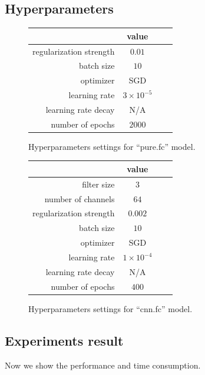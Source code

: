 \documentclass[a4paper]{article}
\begin{document}
\subsection{Hyperparameters}

\begin{figure}[H]
\centering
\begin{tabular}{|r|c|c|c|}
\hline
 & value \\
\hline
regularization strength & $0.01$ \\
\hline
batch size & $10$ \\
\hline
optimizer & SGD \\
\hline
learning rate & $3\times10^{-5}$\\
\hline
learning rate decay & N/A \\
\hline
number of epochs & $2000$ \\
\hline
\end{tabular}
\caption{Hyperparameters settings for ``pure.fc'' model.}
\end{figure}

\begin{figure}[H]
\centering
\begin{tabular}{|r|c|c|c|}
\hline
 & value \\
\hline
filter size & $3$ \\
\hline
number of channels & $64$ \\
\hline
regularization strength & $0.002$ \\
\hline
batch size & $10$ \\
\hline
optimizer & SGD \\
\hline
learning rate & $1\times10^{-4}$\\
\hline
learning rate decay & N/A \\
\hline
number of epochs & $400$ \\
\hline
\end{tabular}
\caption{Hyperparameters settings for ``cnn.fc'' model.}
\end{figure}

\subsection{Experiments result}

Now we show the performance and time consumption.
\end{document}
